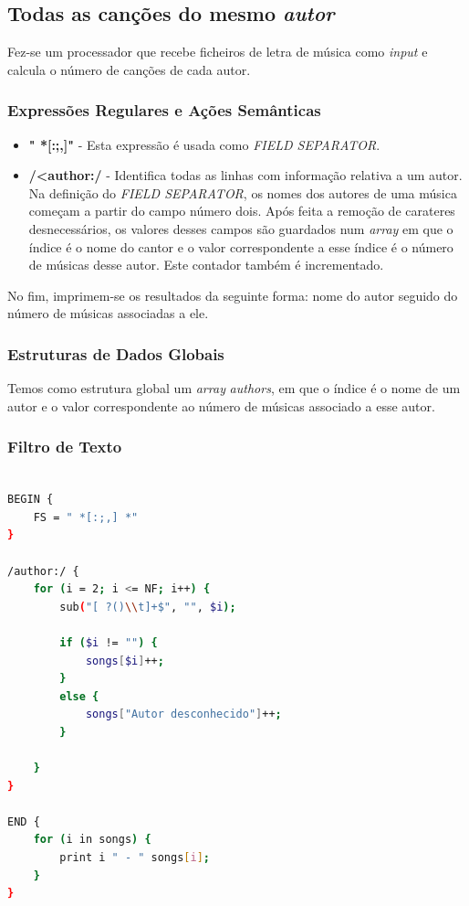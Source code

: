 \documentclass{article}
\begin{document}
\subsection{Todas as canções do mesmo \emph{autor}}

Fez-se um processador que recebe ficheiros de letra de música como \emph{input} e calcula o número de canções de cada autor.

\subsubsection{Expressões Regulares e Ações Semânticas}

\begin{itemize}
    \item \textbf{" *[:;,]"} - Esta expressão é usada como \emph{FIELD SEPARATOR}.
    \item \textbf{/\textless author:/ } - Identifica todas as linhas com informação relativa a um autor. Na definição do \emph{FIELD SEPARATOR}, os nomes dos autores de uma música começam a partir do campo número dois. Após feita a remoção de carateres desnecessários, os valores desses campos são guardados num \emph{array} em que o índice é o nome do cantor e o valor correspondente a esse índice é o número de músicas desse autor. Este contador também é incrementado.
\end{itemize}

No fim, imprimem-se os resultados da seguinte forma: nome do autor seguido do número de músicas associadas a ele.

\subsubsection{Estruturas de Dados Globais}

Temos como estrutura global um \emph{array} \emph{authors}, em que o índice é o nome de um autor e o valor correspondente ao número de músicas associado a esse autor. 

\subsubsection{Filtro de Texto}

\begin{lstlisting}[language=bash]

BEGIN {
	FS = " *[:;,] *"
}

/author:/ {
	for (i = 2; i <= NF; i++) {
		sub("[ ?()\\t]+$", "", $i);

		if ($i != "") {
			songs[$i]++;
		}
		else {
			songs["Autor desconhecido"]++;
		}

	}
}

END {
	for (i in songs) {
		print i " - " songs[i];
	}
}

\end{lstlisting}
\end{document}
